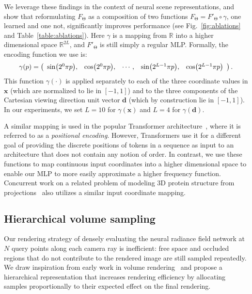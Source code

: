 \documentclass[runningheads]{llncs}
\let\originalleft\left
\let\originalright\right
\renewcommand{\left}{\mathopen{}\mathclose\bgroup\originalleft}
\renewcommand{\right}{\aftergroup\egroup\originalright}
\newcommand{\modeltheta}{\mathrm{\Theta}}
\newcommand{\numsamples}{N}
\newcommand{\numfrequencies}{L}
\begin{document}
We leverage these findings in the context of neural scene representations, and show that reformulating $F_\modeltheta$ as a composition of two functions ${F_\modeltheta = F'_\modeltheta \circ \gamma }$, one learned and one not, significantly improves performance (see Fig.~\ref{fig:ablations} and Table~\ref{table:ablations}).
Here $\gamma$ is a mapping from $\mathbb{R}$ into a higher dimensional space $\mathbb{R}^{2\numfrequencies}$, and $F'_\modeltheta$ is still simply a regular MLP. Formally, the encoding function we use is: 
\begin{equation}
    \gamma(\dummypos) = \left(
    \begin{array}{ccccc}
    \sin\left(2^0 \pi \dummypos\right), &
    \cos\left(2^0 \pi \dummypos\right), &
    \cdots, &
    \sin\left(2^{\numfrequencies-1} \pi \dummypos\right), &
    \cos\left(2^{\numfrequencies-1} \pi \dummypos\right)
    \end{array} \right) \,.
\label{eq:enc}
\end{equation}
This function $\gamma(\cdot)$ is applied separately to each of the three coordinate values in $\mathbf{x}$ (which are normalized to lie in $[-1, 1]$) and to the three components of the Cartesian viewing direction unit vector $\mathbf{d}$ (which by construction lie in $[-1, 1]$). 
In our experiments, we set $L=10$ for $\gamma(\mathbf x)$ and $L=4$ for $\gamma(\mathbf d)$. 

A similar mapping is used in the popular Transformer architecture~\cite{transformer}, where it is referred to as a \emph{positional encoding}. However, Transformers use it for a different goal of providing the discrete positions of tokens in a sequence as input to an architecture that does not contain any notion of order. In contrast, we use these functions to map continuous input coordinates into a higher dimensional space to enable our MLP to more easily approximate a higher frequency function. Concurrent work on a related problem of modeling 3D protein structure from projections~\cite{cryoem} also utilizes a similar input coordinate mapping.

\subsection{Hierarchical volume sampling}
\label{sec:hierarchical}

Our rendering strategy of densely evaluating the neural radiance field network at $\numsamples$ query points along each camera ray is inefficient: free space and occluded regions that do not contribute to the rendered image are still sampled repeatedly.
We draw inspiration from early work in volume rendering~\cite{levoy90} and propose a hierarchical representation that increases rendering efficiency by allocating samples proportionally to their expected effect on the final rendering.
\end{document}
